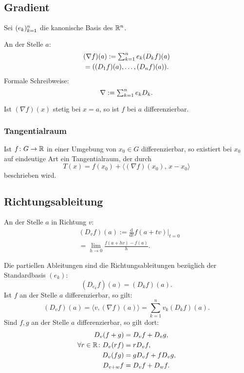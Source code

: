 \subsection{Gradient}
Sei $(e_k)_{k=1}^n$ die kanonische Basis des $\mathbb R^n$.
\begin{definition}[Gradient]\mbox{}\newline
An der Stelle $a$:
\begin{equation}
\begin{split}
&(\nabla f)(a) := \textstyle\sum_{k=1}^n e_k (D_k f)(a)\\
&= ((D_1 f)(a),\ldots,(D_n f)(a)).
\end{split}
\end{equation}
Formale Schreibweise:
\begin{equation}
\nabla := \textstyle\sum_{k=1}^n e_k D_k.
\end{equation}
\end{definition}
\noindent
Ist $(\nabla f)(x)$ stetig bei $x=a$, so
ist $f$ bei $a$ differenzierbar.

\subsubsection{Tangentialraum}
Ist $f\colon G\to\mathbb R$ in einer Umgebung von $x_0\in G$
differenzierbar, so existiert bei $x_0$ auf eindeutige Art
ein Tangentialraum, der durch
\begin{equation}
T(x) = f(x_0)+\langle(\nabla f)(x_0),\,x-x_0\rangle
\end{equation}
beschrieben wird.

\subsection{Richtungsableitung}
\begin{definition}[Richtungsableitung]\mbox{}\newline
An der Stelle $a$ in Richtung $v$:
\begin{equation}
\begin{split}
& (D_v f)(a) := \frac{\mathrm d}{\mathrm dt} f(a+tv)\Big|_{t=0}\\
& = \lim_{h\to 0} \frac{f(a+hv)-f(a)}{h}.
\end{split}
\end{equation}
\end{definition}
\noindent
Die partiellen Ableitungen sind die Richtungsableitungen
bezüglich der Standardbasis $(e_k)$:
\begin{equation}
(D_{\displaystyle e_k}f)(a) = (D_k f)(a).
\end{equation}
Ist $f$ an der Stelle $a$ differenzierbar, so gilt:
\begin{equation}
(D_v f)(a) = \langle v,(\nabla f)(a)\rangle
= \sum_{k=1}^n v_k (D_k f)(a).
\end{equation}
Sind $f,g$ an der Stelle $a$ differenzierbar, so gilt dort:
\begin{align}
D_v (f+g) &= D_v f+D_v g,\\
\forall r\in\mathbb R\colon D_v (rf) &= rD_v f,\\
D_v (fg) &= gD_v f+fD_v g,\\
D_{v+w} f &= D_v f+D_w f.
\end{align}

